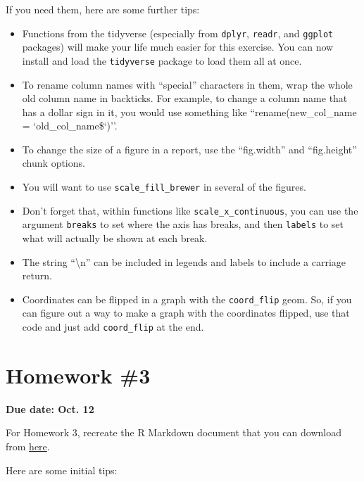 \documentclass[]{book}
\providecommand{\tightlist}{%
  \setlength{\itemsep}{0pt}\setlength{\parskip}{0pt}}
\theoremstyle{definition}
\theoremstyle{definition}
\theoremstyle{definition}
\theoremstyle{remark}
\begin{document}
If you need them, here are some further tips:

\begin{itemize}
\tightlist
\item
  Functions from the tidyverse (especially from \texttt{dplyr},
  \texttt{readr}, and \texttt{ggplot} packages) will make your life much
  easier for this exercise. You can now install and load the
  \texttt{tidyverse} package to load them all at once.
\item
  To rename column names with ``special'' characters in them, wrap the
  whole old column name in backticks. For example, to change a column
  name that has a dollar sign in it, you would use something like
  ``rename(new\_col\_name = `old\_col\_name\$`)''.
\item
  To change the size of a figure in a report, use the ``fig.width'' and
  ``fig.height'' chunk options.
\item
  You will want to use \texttt{scale\_fill\_brewer} in several of the
  figures.
\item
  Don't forget that, within functions like
  \texttt{scale\_x\_continuous}, you can use the argument
  \texttt{breaks} to set where the axis has breaks, and then
  \texttt{labels} to set what will actually be shown at each break.
\item
  The string ``\textbackslash{}n'' can be included in legends and labels
  to include a carriage return.
\item
  Coordinates can be flipped in a graph with the \texttt{coord\_flip}
  geom. So, if you can figure out a way to make a graph with the
  coordinates flipped, use that code and just add \texttt{coord\_flip}
  at the end.
\end{itemize}

\section{Homework \#3}\label{homework-3}

\textbf{Due date: Oct. 12}

For Homework 3, recreate the R Markdown document that you can download
from
\href{https://github.com/geanders/RProgrammingForResearch/raw/master/Homework/Homework_3.docx}{here}.

Here are some initial tips:
\end{document}
